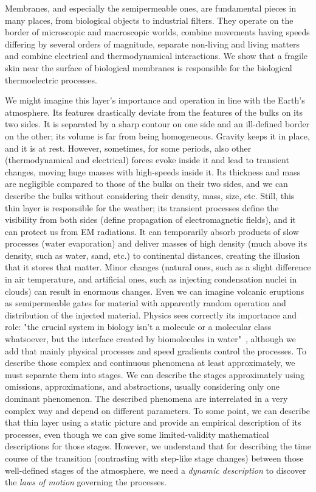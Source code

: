 Membranes, and especially the semipermeable ones, are fundamental pieces in many places, from biological objects
to industrial filters. They operate on the border of microscopic and
macroscopic worlds, combine movements having speeds differing by several orders of magnitude, separate non-living and living matters and
combine electrical and thermodynamical interactions. We show that a
fragile skin near the surface of biological membranes
is responsible for the biological thermoelectric processes.


We might imagine \hypertarget{DynamicLayer}{this layer's} importance and operation in
line with the Earth's atmosphere. Its features drastically deviate
from the features of the bulks on its two sides. It is separated by
a sharp contour on one side and an ill-defined border on the other;
its volume is far from being homogeneous. Gravity keeps it in place, and it is at rest. However, sometimes,
for some periods, also other (thermodynamical and electrical) forces evoke
inside it and lead to transient changes, moving huge masses with  high-speeds
inside it. Its thickness and mass are negligible compared to those
of the bulks on their two sides, and we can describe the bulks without
considering their density, mass, size, etc. Still, this thin layer is
responsible for the weather; its transient processes define the visibility
from both sides (define propagation of electromagnetic fields), and
it can protect us from 
\gls{EM}
radiations. It can temporarily absorb
products of slow processes (water evaporation) and deliver masses of
high density (much above its density, such as water, sand, etc.) to
continental distances, creating the illusion that it stores that matter.
Minor changes (natural ones, such as a slight difference in air temperature, and artificial ones, such as injecting condensation nuclei in clouds)
can result in enormous changes. Even we can imagine volcanic eruptions
as semipermeable gates for material with apparently random operation
and distribution of the injected material.
Physics sees correctly its importance and role:
"the crucial system in biology isn't a molecule or a molecular class whatsoever,
but the interface created by biomolecules in water"~\cite{LivingSystemPhysics:2021}, although we add that mainly
physical processes and speed gradients control the processes.
To describe those complex and continuous phenomena at least approximately,
we must separate them into stages. We can describe the stages approximately using omissions, approximations, and
abstractions, usually considering
only one dominant phenomenon.  The described phenomena are interrelated
in a very complex way and depend on different parameters. To some
point, we can describe that thin layer using a static picture and
provide an empirical description of its processes, even though 
we can give some limited-validity mathematical descriptions for those
stages. However, we understand that for describing the time course of the transition
(contrasting with step-like stage changes) between those well-defined
stages of the atmosphere, we need a \emph{dynamic description} to
discover the \emph{laws of motion} governing the processes.

